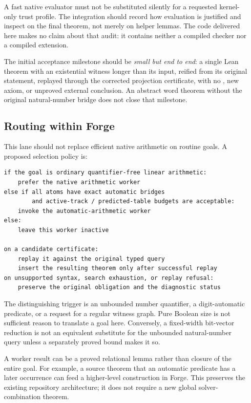 A fast native evaluator must not be substituted silently for a requested kernel-only trust profile. The integration should record how evaluation is justified and inspect  on the final theorem, not merely on helper lemmas. The code delivered here makes no claim about that audit: it contains neither a compiled checker nor a compiled  extension.

The initial acceptance milestone should be \emph{small but end to end}: a single Lean theorem with an existential witness longer than its input, reified from its original statement, replayed through the corrected projection certificate, with no , new axiom, or unproved external conclusion. An abstract word theorem without the original natural-number bridge does not close that milestone.

\subsection{Routing within Forge}
This lane should not replace efficient native arithmetic on routine goals. A proposed selection policy is:
\begin{lstlisting}
if the goal is ordinary quantifier-free linear arithmetic:
    prefer the native arithmetic worker
else if all atoms have exact automatic bridges
        and active-track / predicted-table budgets are acceptable:
    invoke the automatic-arithmetic worker
else:
    leave this worker inactive

on a candidate certificate:
    replay it against the original typed query
    insert the resulting theorem only after successful replay
on unsupported syntax, search exhaustion, or replay refusal:
    preserve the original obligation and the diagnostic status
\end{lstlisting}
The distinguishing trigger is an unbounded number quantifier, a digit-automatic predicate, or a request for a regular witness graph. Pure Boolean size is not sufficient reason to translate a goal here. Conversely, a fixed-width bit-vector reduction is not an equivalent substitute for the unbounded natural-number query unless a separately proved bound makes it so.

A worker result can be a proved relational lemma rather than closure of the entire goal. For example, a source theorem that an automatic predicate has a later occurrence can feed a higher-level construction in Forge. This preserves the existing repository architecture; it does not require a new global solver-combination theorem.
